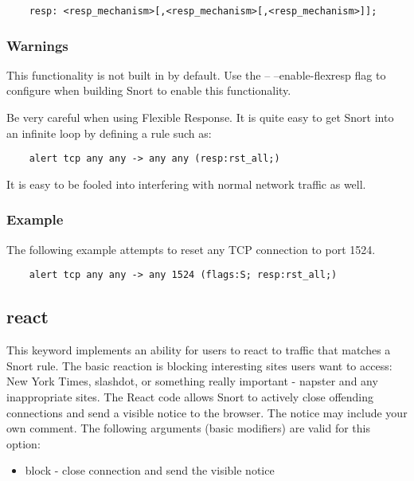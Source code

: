 \documentclass[english]{report}
\begin{document}
\begin{verbatim}
    resp: <resp_mechanism>[,<resp_mechanism>[,<resp_mechanism>]];
\end{verbatim}

\subsubsection{Warnings}

This functionality is not built in by default.  Use the -- --enable-flexresp
flag to configure when building Snort to enable this functionality.

Be very careful when using Flexible Response. It is quite easy to get Snort
into an infinite loop by defining a rule such as:

\begin{verbatim}
    alert tcp any any -> any any (resp:rst_all;)
\end{verbatim}

It is easy to be fooled into interfering with normal network traffic as well.

\subsubsection{Example}

The following example attempts to reset any TCP connection to port 1524.
\begin{verbatim}
    alert tcp any any -> any 1524 (flags:S; resp:rst_all;)
\end{verbatim}

\subsection{react}

This keyword implements an ability for users to react to traffic that matches a
Snort rule. The basic reaction is blocking interesting sites users want to
access: New York Times, slashdot, or something really important - napster and
any inappropriate sites. The React code allows Snort to actively close offending 
connections and send a visible notice to the browser. The notice may include your own
comment. The following arguments (basic modifiers) are valid for this option:

\begin{itemize}
\item block - close connection and send the visible notice 
\end{itemize}
\end{document}
